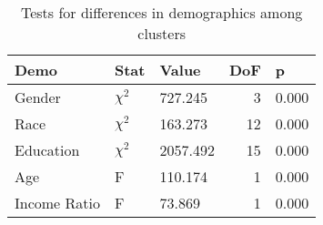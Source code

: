 \begin{table}[h]
\caption{Tests for differences in demographics among clusters}
\label{tab:cluster_demo_tests}
\begin{tabular}{lllrl}
\toprule
Demo & Stat & Value & DoF & p \\
\midrule
Gender & \(\chi^2\) & 727.245 & 3 & 0.000 \\
Race & \(\chi^2\) & 163.273 & 12 & 0.000 \\
Education & \(\chi^2\) & 2057.492 & 15 & 0.000 \\
Age & F & 110.174 & 1 & 0.000 \\
Income Ratio & F & 73.869 & 1 & 0.000 \\
\bottomrule
\end{tabular}
\end{table}
